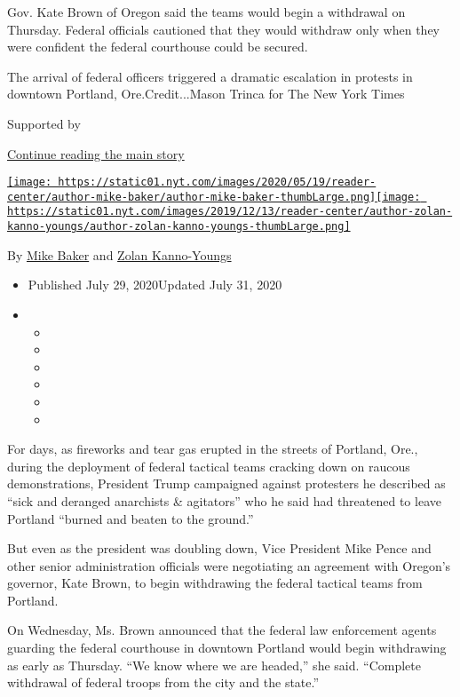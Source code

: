 Gov. Kate Brown of Oregon said the teams would begin a withdrawal on
Thursday. Federal officials cautioned that they would withdraw only when
they were confident the federal courthouse could be secured.

The arrival of federal officers triggered a dramatic escalation in
protests in downtown Portland, Ore.Credit...Mason Trinca for The New
York Times

Supported by

\protect\hyperlink{after-sponsor}{Continue reading the main story}

\href{https://www.nytimes.com/by/mike-baker}{\texttt{[image: https://static01.nyt.com/images/2020/05/19/reader-center/author-mike-baker/author-mike-baker-thumbLarge.png]}}\href{https://www.nytimes.com/by/zolan-kanno-youngs}{\texttt{[image: https://static01.nyt.com/images/2019/12/13/reader-center/author-zolan-kanno-youngs/author-zolan-kanno-youngs-thumbLarge.png]}}

By \href{https://www.nytimes.com/by/mike-baker}{Mike Baker} and
\href{https://www.nytimes.com/by/zolan-kanno-youngs}{Zolan Kanno-Youngs}

\begin{itemize}
\item
  Published July 29, 2020Updated July 31, 2020
\item
  \begin{itemize}
  \item
  \item
  \item
  \item
  \item
  \item
  \end{itemize}
\end{itemize}

For days, as fireworks and tear gas erupted in the streets of Portland,
Ore., during the deployment of federal tactical teams cracking down on
raucous demonstrations, President Trump campaigned against protesters he
described as ``sick and deranged anarchists \& agitators'' who he said
had threatened to leave Portland ``burned and beaten to the ground.''

But even as the president was doubling down, Vice President Mike Pence
and other senior administration officials were negotiating an agreement
with Oregon's governor, Kate Brown, to begin withdrawing the federal
tactical teams from Portland.

On Wednesday, Ms. Brown announced that the federal law enforcement
agents guarding the federal courthouse in downtown Portland would begin
withdrawing as early as Thursday. ``We know where we are headed,'' she
said. ``Complete withdrawal of federal troops from the city and the
state.''

